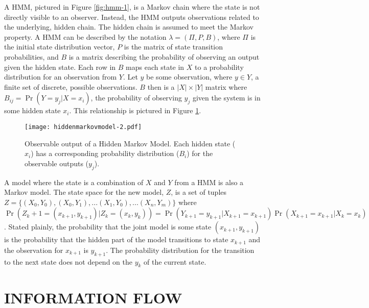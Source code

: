 A \ac{HMM}, pictured in Figure \ref{fig:hmm-1}, is a Markov chain where the state is not directly visible to an observer.
Instead, the \ac{HMM} outputs observations related to the underlying, hidden chain.
The hidden chain is assumed to meet the Markov property.
A \ac{HMM} can be described by the notation $\lambda = (\Pi, P, B)$, where $\Pi$ is the initial state distribution vector, $P$ is the matrix of state transition probabilities, and $B$ is a matrix describing the probability of observing an output given the hidden state.
Each row in $B$ maps each state in $X$ to a probability distribution for an observation from $Y$.
Let $y$ be some observation, where $y \in Y$, a finite set of discrete, possible observations.
$B$ then is a $|X|\times|Y|$ matrix where $B_{ij} = \Pr(Y=y_j|X=x_i)$, the probability of observing $y_j$ given the system is in some hidden state $x_i$.
This relationship is pictured in Figure \ref{fig:hmm-2}.

\begin{figure}
	\centering
	\texttt{[image: hiddenmarkovmodel-2.pdf]}
	\caption[Observable output of a hidden Markov model.]{Observable output of a Hidden Markov Model. Each hidden state ($x_i$) has a corresponding probability distribution ($B_i$) for the observable outputs ($y_j$).}
	\label{fig:hmm-2}
\end{figure}

A model where the state is a combination of $X$ and $Y$ from a \ac{HMM} is also a Markov model.
The state space for the new model, $Z$, is a set of tuples $Z = \{(X_0,Y_0), (X_0, Y_1), ... (X_1, Y_0), ... (X_n,Y_m)  \}$ where $\Pr(Z_k+1=(x_{k+1}, y_{k+1})|Z_k=(x_k, y_k)) = \Pr(Y_{k+1}=y_{k+1}|X_{k+1}=x_{k+1})\Pr(X_{k+1}=x_{k+1}|X_{k}=x_k)$.
Stated plainly, the probability that the joint model is some state $(x_{k+1},y_{k+1})$ is the probability that the hidden part of the model transitions to state $x_{k+1}$ and the observation for $x_{k+1}$ is $y_{k+1}$.
The probability distribution for the transition to the next state does not depend on the $y_k$ of the current state.

\section{INFORMATION FLOW}


